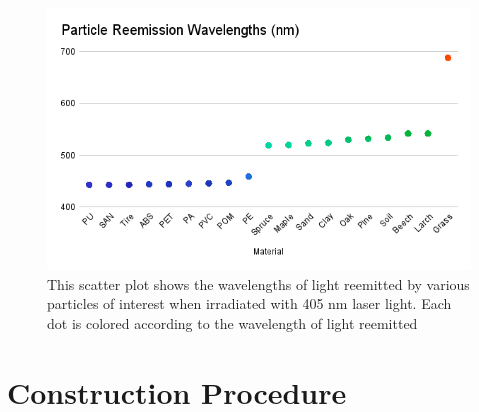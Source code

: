 \documentclass[fleqn,10pt]{SelfArx} %
\begin{document}
	\begin{figure}[h]
		\centering
		\includegraphics[width=1\linewidth]{Figures/ReemissionWavelengths}
		\caption[Particle Reemission Wavelengths]{This scatter plot shows the wavelengths of light reemitted by various particles of interest when irradiated with 405 nm laser light. Each dot is colored according to the wavelength of light reemitted}
		\label{fig:Reemission}
	\end{figure}
	
	\section{Construction Procedure}
	
\end{document}
